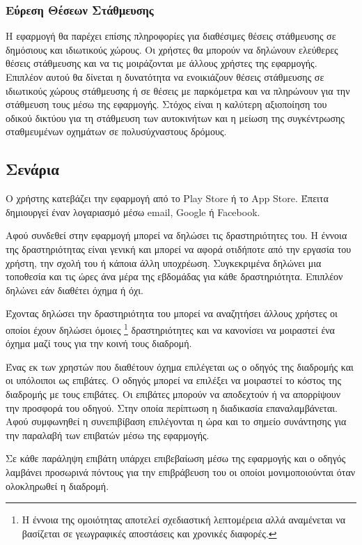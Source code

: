 \documentclass[11pt]{article}
\begin{document}
\subsubsection{Εύρεση Θέσεων Στάθμευσης}

Η εφαρμογή θα παρέχει επίσης πληροφορίες για διαθέσιμες θέσεις
στάθμευσης σε δημόσιους και ιδιωτικούς χώρους. Οι χρήστες θα
μπορούν να δηλώνουν ελεύθερες θέσεις στάθμευσης και να τις μοιράζονται με
άλλους χρήστες της εφαρμογής. Επιπλέον αυτού θα δίνεται η δυνατότητα να
ενοικιάζουν θέσεις στάθμευσης σε ιδιωτικούς χώρους στάθμευσης ή σε θέσεις
με παρκόμετρα και να πληρώνουν για την στάθμευση τους μέσω της εφαρμογής.
Στόχος είναι η καλύτερη αξιοποίηση του οδικού δικτύου για τη στάθμευση
των αυτοκινήτων και η μείωση της συγκέντρωσης σταθμευμένων οχημάτων σε
πολυσύχναστους δρόμους.

\subsection{Σενάρια}

Ο χρήστης κατεβάζει την εφαρμογή από το Play Store ή το App Store.
Έπειτα δημιουργεί έναν λογαριασμό μέσω email, Google ή Facebook.

Αφού συνδεθεί στην εφαρμογή μπορεί να δηλώσει τις δραστηριότητες του.
Η έννοια της δραστηριότητας είναι γενική και μπορεί να αφορά οτιδήποτε
από την εργασία του χρήστη, την σχολή του ή κάποια άλλη υποχρέωση.
Συγκεκριμένα δηλώνει μια τοποθεσία και τις ώρες άνα μέρα της εβδομάδας
για κάθε δραστηριότητα. Επιπλέον δηλώνει εάν διαθέτει όχημα ή όχι.

Έχοντας δηλώσει την δραστηριότητα του μπορεί να αναζητήσει άλλους χρήστες
οι οποίοι έχουν δηλώσει όμοιες
\footnote{
    Η έννοια της ομοιότητας αποτελεί σχεδιαστική λεπτομέρεια αλλά
    αναμένεται να βασίζεται σε γεωγραφικές αποστάσεις και χρονικές διαφορές.
}
δραστηριότητες και να κανονίσει να μοιραστεί ένα όχημα μαζί τους για
την κοινή τους διαδρομή.

Ένας εκ των χρηστών που διαθέτουν όχημα επιλέγεται
ως ο οδηγός της διαδρομής και οι υπόλοιποι ως επιβάτες. Ο οδηγός μπορεί να
επιλέξει να μοιραστεί το κόστος της διαδρομής με τους επιβάτες. Οι
επιβάτες μπορούν να αποδεχτούν ή να απορρίψουν την προσφορά του οδηγού.
Στην οποία περίπτωση η διαδικασία επαναλαμβάνεται.
Αφού συμφωνηθεί η συνεπιβίβαση επιλέγονται η ώρα και το σημείο συνάντησης
για την παραλαβή των επιβατών μέσω της εφαρμογής.

Σε κάθε παράληψη επιβάτη υπάρχει επιβεβαίωση μέσω της εφαρμογής και ο
οδηγός λαμβάνει προσωρινά πόντους για την επιβράβευση του οι οποίοι
μονιμοποιούνται όταν ολοκληρωθεί η διαδρομή.
\end{document}

